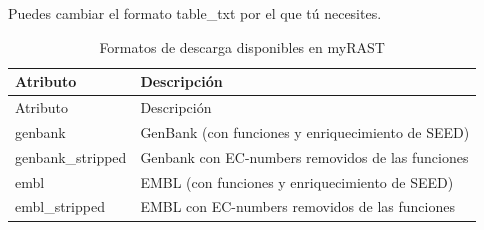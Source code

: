 \documentclass[12pt,twoside]{reedthesis}
\begin{document}
  Puedes cambiar el formato table\_txt por el que tú necesites.
  
  \begin{longtable}[]{@{}ll@{}}
  \caption{Formatos de descarga disponibles en myRAST
  \label{tab:myrast}}\tabularnewline
  \toprule
  \begin{minipage}[b]{0.22\columnwidth}\raggedright\strut
  Atributo\strut
  \end{minipage} & \begin{minipage}[b]{0.72\columnwidth}\raggedright\strut
  Descripción\strut
  \end{minipage}\tabularnewline
  \midrule
  \endfirsthead
  \toprule
  \begin{minipage}[b]{0.22\columnwidth}\raggedright\strut
  Atributo\strut
  \end{minipage} & \begin{minipage}[b]{0.72\columnwidth}\raggedright\strut
  Descripción\strut
  \end{minipage}\tabularnewline
  \midrule
  \endhead
  \begin{minipage}[t]{0.22\columnwidth}\raggedright\strut
  genbank\strut
  \end{minipage} & \begin{minipage}[t]{0.72\columnwidth}\raggedright\strut
  GenBank (con funciones y enriquecimiento de SEED)\strut
  \end{minipage}\tabularnewline
  \begin{minipage}[t]{0.22\columnwidth}\raggedright\strut
  genbank\_stripped\strut
  \end{minipage} & \begin{minipage}[t]{0.72\columnwidth}\raggedright\strut
  Genbank con EC-numbers removidos de las funciones\strut
  \end{minipage}\tabularnewline
  \begin{minipage}[t]{0.22\columnwidth}\raggedright\strut
  embl\strut
  \end{minipage} & \begin{minipage}[t]{0.72\columnwidth}\raggedright\strut
  EMBL (con funciones y enriquecimiento de SEED)\strut
  \end{minipage}\tabularnewline
  \begin{minipage}[t]{0.22\columnwidth}\raggedright\strut
  embl\_stripped\strut
  \end{minipage} & \begin{minipage}[t]{0.72\columnwidth}\raggedright\strut
  EMBL con EC-numbers removidos de las funciones\strut
  \end{minipage}\tabularnewline

\end{longtable}
\end{document}
